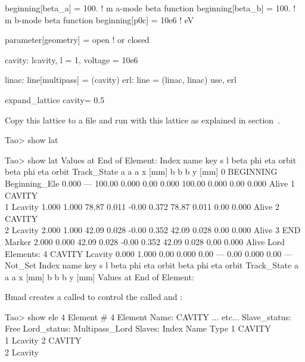 \documentclass{hitec}
\begin{document}
\begin{code}
beginning[beta_a] = 100.   ! m  a-mode beta function
beginning[beta_b] = 100.   ! m  b-mode beta function
beginning[p0c] = 10e6   ! eV   

parameter[geometry] = open      ! or closed

cavity: lcavity, l = 1, voltage = 10e6

linac: line[multipass] = (cavity)
erl: line = (linac, linac) 
use, erl

expand_lattice                
cavity = 0.5
\end{code}

Copy this lattice to a file and run \tao with this lattice as explained in
section~. 


\begin{code}
Tao> show lat

Tao> show lat
      Values at End of Element:
 Index  name      key                       s       l    beta     phi    eta  orbit     beta     phi    eta  orbit    Track_State
                                                            a       a      a  x [mm]       b       b      b  y [mm]
     0  BEGINNING Beginning_Ele         0.000     ---  100.00   0.000   0.00   0.000  100.00   0.000   0.00   0.000   Alive
     1  CAVITY\\1  Lcavity               1.000   1.000   78.87   0.011  -0.00   0.372   78.87   0.011   0.00   0.000   Alive
     2  CAVITY\\2  Lcavity               2.000   1.000   42.09   0.028  -0.00   0.352   42.09   0.028   0.00   0.000   Alive
     3  END       Marker                2.000   0.000   42.09   0.028  -0.00   0.352   42.09   0.028   0.00   0.000   Alive
Lord Elements:
     4  CAVITY    Lcavity               0.000   1.000    0.00   0.000   0.00     ---    0.00   0.000   0.00     ---   Not_Set
 Index  name      key                       s       l    beta     phi    eta  orbit     beta     phi    eta  orbit    Track_State
                                                        a       a      a  x [mm]       b       b      b  y [mm]
  Values at End of Element:
\end{code}

Bmad creates a  called  to control the  called
 and :
\begin{code}
Tao> show ele 4
 Element #                4
 Element Name: CAVITY
... etc...
Slave_status: Free
Lord_status:  Multipass_Lord
Slaves:
   Index   Name        Type
       1   CAVITY\\1    Lcavity
       2   CAVITY\\2    Lcavity
\end{code}
\end{document}
